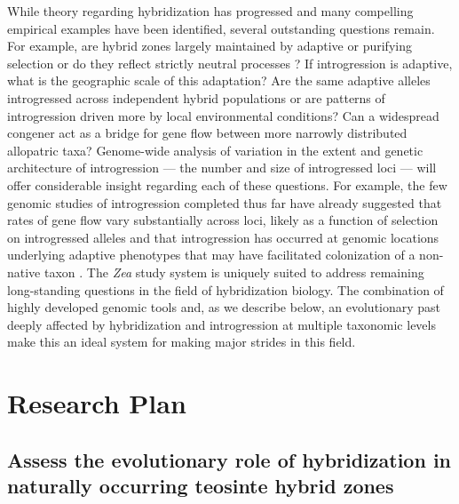  While theory regarding hybridization has progressed and many compelling empirical examples have been identified, several outstanding questions remain. 
For example, are hybrid zones largely maintained by adaptive or purifying selection or do they reflect strictly neutral processes \citep{Kruuk1999, Rasmussen2012, Smith2013b}? 
If introgression is adaptive, what is the geographic scale of this adaptation?
Are the same adaptive alleles introgressed across independent hybrid populations or are patterns of introgression driven more by local environmental conditions?
Can a widespread congener act as a bridge for gene flow between more narrowly distributed allopatric taxa?
Genome-wide analysis of variation in the extent and genetic architecture of introgression --- the number and size of introgressed loci ---  will offer considerable insight regarding each of these questions.  
For example, the few genomic studies of introgression completed thus far have already suggested that rates of gene flow vary substantially across loci, likely as a function of selection on introgressed alleles \citep{Hufford2013, Poelstra2014} and that introgression has occurred at genomic locations underlying adaptive phenotypes that may have facilitated colonization of a non-native taxon \citep{Hufford2013}.
The \emph{Zea} study system is uniquely suited to address remaining long-standing questions in the field of hybridization biology.
The combination of highly developed genomic tools and, as we describe below, an evolutionary past deeply affected by hybridization and introgression at multiple taxonomic levels make this an ideal system for making major strides in this field.


\section*{Research Plan}
\subsection{Assess the evolutionary role of hybridization in naturally occurring teosinte hybrid zones}
\label{ss:hybrids}

